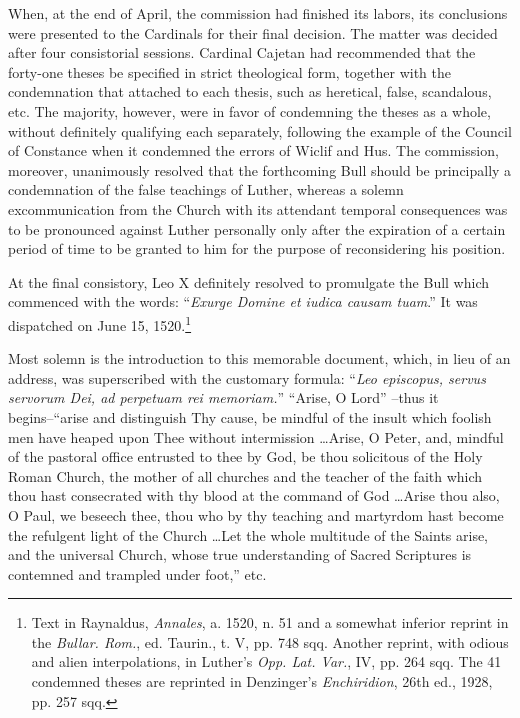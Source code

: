 When, at the end of April, the commission had finished its labors,
its conclusions were presented to the Cardinals for their final decision.
The matter was decided after four consistorial sessions. Cardinal Cajetan
had recommended that the forty-one theses be specified
in strict theological form, together with the condemnation that attached
to each thesis, such as heretical, false, scandalous, etc. The majority,
however, were in favor of condemning the theses as a whole,
without definitely qualifying each separately, following the example
of the Council of Constance when it condemned the errors of Wiclif
and Hus. The commission, moreover, unanimously resolved that the
forthcoming Bull should be principally a condemnation of the false
teachings of Luther, whereas a solemn excommunication from the
Church with its attendant temporal consequences was to be pronounced against
Luther personally only after the expiration of a
certain period of time to be granted to him for the purpose of reconsidering
his position.

At the final consistory, Leo X definitely resolved to promulgate the
Bull which commenced with the words: “\textit{Exurge Domine et iudica
causam tuam}.” It was dispatched on June 15, 1520.\footnote
{Text in Raynaldus, \textit{Annales}, a. 1520, n. 51 and a somewhat inferior reprint in the
\textit{Bullar. Rom.}, ed. Taurin., t. V, pp. 748 sqq. Another reprint, with odious and alien interpolations,
in Luther’s \textit{Opp. Lat. Var.}, IV, pp. 264 sqq. The 41 condemned theses are
reprinted in Denzinger’s \textit{Enchiridion}, 26th ed., 1928, pp. 257 sqq.}


Most solemn is the introduction to this memorable document, which, in
lieu of an address, was superscribed with the customary formula: ``\textit{Leo episcopus,
servus servorum Dei, ad perpetuam rei memoriam.}” “Arise, O Lord”
--thus it begins--``arise and distinguish Thy cause, be mindful of the insult
which foolish men have heaped upon Thee without intermission \dots Arise,
O Peter, and, mindful of the pastoral office entrusted to thee by God,
be thou solicitous of the Holy Roman Church, the mother of all churches
and the teacher of the faith which thou hast consecrated with thy blood
at the command of God \dots Arise thou also, O Paul, we beseech thee,
thou who by thy teaching and martyrdom hast become the refulgent light
of the Church \dots Let the whole multitude of the Saints arise, and the
universal Church, whose true understanding of Sacred Scriptures is
contemned and trampled under foot,” etc.

